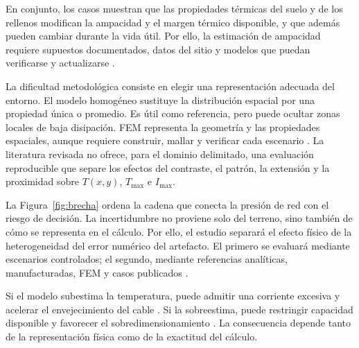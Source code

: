 \documentclass[11pt,a4paper,oneside]{report}
\newcommand{\Tmax}{T_{\max}}
\newcommand{\Imax}{I_{\max}}
\begin{document}
En conjunto, los casos muestran que las propiedades térmicas del suelo y de los rellenos modifican la ampacidad y el margen térmico disponible, y que además pueden cambiar durante la vida útil. Por ello, la estimación de ampacidad requiere supuestos documentados, datos del sitio y modelos que puedan verificarse y actualizarse \parencites{fariz2026}{mobius2025}.

La dificultad metodológica consiste en elegir una representación adecuada del entorno. El modelo homogéneo sustituye la distribución espacial por una propiedad única o promedio. Es útil como referencia, pero puede ocultar zonas locales de baja disipación. FEM representa la geometría y las propiedades espaciales, aunque requiere construir, mallar y verificar cada escenario \parencites[3--4,93--99]{cigre2025}[1--3]{aldulaimi2024}. La literatura revisada no ofrece, para el dominio delimitado, una evaluación reproducible que separe los efectos del contraste, el patrón, la extensión y la proximidad sobre $T(x,y)$, $\Tmax$ e $\Imax$.

La Figura~\ref{fig:brecha} ordena la cadena que conecta la presión de red con el riesgo de decisión. La incertidumbre no proviene solo del terreno, sino también de cómo se representa en el cálculo. Por ello, el estudio separará el efecto físico de la heterogeneidad del error numérico del artefacto. El primero se evaluará mediante escenarios controlados; el segundo, mediante referencias analíticas, manufacturadas, FEM y casos publicados \parencites[4--6]{enescu2021}[3--4,93--99]{cigre2025}.

Si el modelo subestima la temperatura, puede admitir una corriente excesiva y acelerar el envejecimiento del cable \parencite[1--2,9]{khumalo2025}. Si la sobreestima, puede restringir capacidad disponible y favorecer el sobredimensionamiento \parencites[4--6]{enescu2021}[1--2,9]{khumalo2025}. La consecuencia depende tanto de la representación física como de la exactitud del cálculo.

\vspace{0.15cm}
\end{document}
